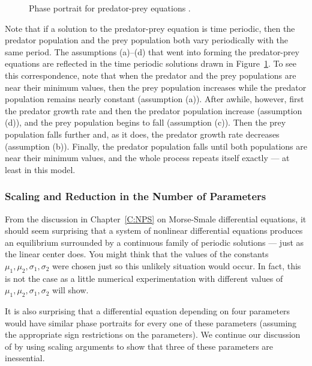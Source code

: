 \documentclass{ximera}
\begin{document}
\begin{figure}[htb]
           \centerline{%
	   }
           \caption{Phase portrait for predator-prey equations 
		\protect{}.}
           \label{F:PP1}
\end{figure}

Note that if a solution to the predator-prey equation is time periodic, then 
the predator population and the prey population both vary periodically with 
the same period.  The assumptions (a)--(d) that went into forming the
predator-prey equations  are reflected in the time periodic 
solutions drawn in Figure~\ref{F:PP1}.  To see this correspondence, note that 
when the predator and the prey populations are near their minimum values, then 
the prey population increases while the predator population remains nearly 
constant (assumption (a)).  After awhile, however, first the predator growth
rate and then the predator population increase (assumption (d)), and the prey 
population begins to fall (assumption (c)).  Then the prey population falls 
further and, as it does, the predator growth rate decreases (assumption (b)). 
Finally, the predator population falls until both populations are near their 
minimum values, and the whole process repeats itself exactly --- at least in
this model.  

\subsubsection*{Scaling and Reduction in the Number of Parameters}

From the discussion in Chapter~\ref{C:NPS} on Morse-Smale differential
equations, it should seem surprising that a system of nonlinear differential 
equations produces an equilibrium surrounded by a continuous family of 
periodic solutions --- just as the linear center does.  You 
might think that the values of the constants $\mu_1,\mu_2,\sigma_1,\sigma_2$ 
were chosen just so this unlikely situation would occur.  In fact, this is 
not the case as a little numerical experimentation with different values of 
$\mu_1,\mu_2,\sigma_1,\sigma_2$ will show.  

It is also surprising that a differential equation depending on four
parameters would have similar phase portraits for every one of
these parameters (assuming the appropriate sign restrictions on
the parameters).  We continue our discussion of  by using scaling
arguments to show that three of these parameters are inessential.  
\end{document}
